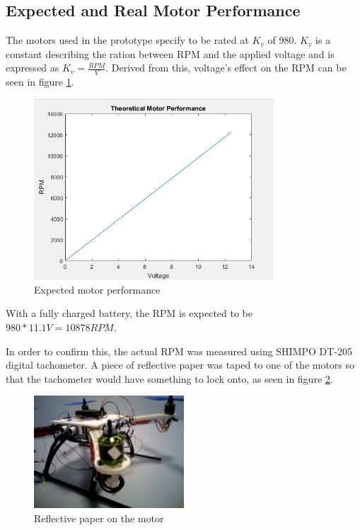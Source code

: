 \subsection{Expected and Real Motor Performance}
The motors used in the prototype specify to be rated at $K_v$ of 980. $K_v$ is a constant describing the ration between RPM and the applied voltage and is expressed as $K_v = \frac{RPM}{V}$. Derived from this, voltage's effect on the RPM can be seen in figure \ref{KvPlot}.
\begin{figure}[H]
  \centering
    \includegraphics[width=0.8\textwidth]{images/KvPlot.png}
	\caption{Expected motor performance}
	\label{KvPlot}
\end{figure}
With a fully charged battery, the RPM is expected to be $980*11.1V = 10878 RPM$.

In order to confirm this, the actual RPM was measured using SHIMPO DT-205 digital tachometer. A piece of reflective paper was taped to one of the motors so that the tachometer would have something to lock onto, as seen in figure \ref{tachometer}.

\begin{figure}[H]
  \centering
    \includegraphics[width=0.5\textwidth]{images/tachometer.jpg}
	\caption{Reflective paper on the motor}
	\label{tachometer}
\end{figure}

